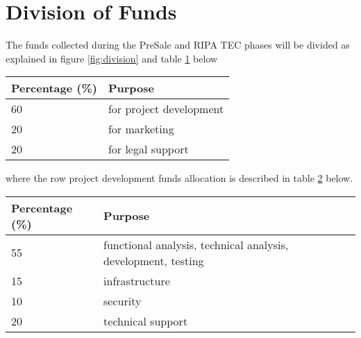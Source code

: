 \documentclass[11pt,fleqn,oneside]{book} %
\begin{document}
\section{Division of Funds}
The funds collected during the PreSale and RIPA TEC phases will be divided as explained in figure \ref{fig:division} and 
table \ref{tab:division} below

\vspace{5mm}
\label{fig:division}

\vspace{5mm}
\begin{table}[H]
	\centering
	\begin{tabular}{l l}
		\toprule
		\textbf{Percentage (\%)} & \textbf{Purpose} \\
		\midrule
		60		& for project development	\\
		20		& for marketing	\\
		20		& for legal support	\\
		\bottomrule
	\end{tabular}
	\label{tab:division}
\end{table}

\vspace{5mm}
where the row project development funds allocation is described in table \ref{tab:focus} below.

\vspace{5mm}
\begin{table}[H]
	\centering
	\begin{tabular}{l l}
		\toprule
		\textbf{Percentage (\%)} & \textbf{Purpose} \\
		\midrule
		55		& functional analysis, technical analysis, development, testing	\\
		15		& infrastructure	\\
		10		& security	\\
		20		& technical support	\\
		\bottomrule
	\end{tabular}
	\label{tab:focus}
\end{table}

\end{document}
